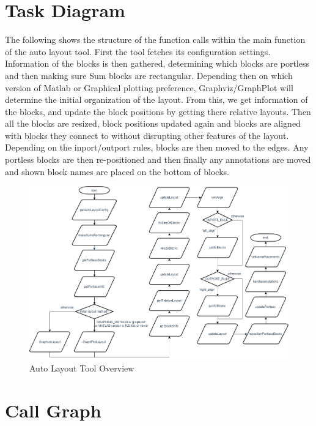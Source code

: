 \documentclass[12pt,letterpaper]{report}
\begin{document}
\section{Task Diagram}
\par The following shows the structure of the function calls within the main function of the auto layout tool. First the tool fetches its configuration settings. Information of the blocks is then gathered, determining which blocks are portless and then making sure Sum blocks are rectangular. Depending then on which version of Matlab or Graphical plotting preference, Graphviz/GraphPlot will determine the initial organization of the layout. From this, we get information of the blocks, and update the block positions by getting there relative layouts. Then all the blocks are resized, block positions updated again and blocks are aligned with blocks they connect to without disrupting other features of the layout. Depending on the inport/outport rules, blocks are then moved to the edges. Any portless blocks are then re-positioned and then finally any annotations are moved and shown block names are placed on the bottom of blocks.



\begin{figure}[h]
	\centering
	\includegraphics[width=1\linewidth]{images/AutoLayout_DrawIO_TaskDiagram}
	\caption{Auto Layout Tool Overview}
	\label{fig:taskdiagram}
\end{figure}

\section{Call Graph}
\end{document}
